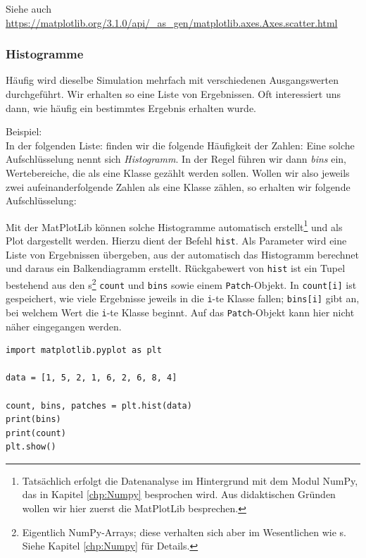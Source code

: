 Siehe auch \url{https://matplotlib.org/3.1.0/api/_as_gen/matplotlib.axes.Axes.scatter.html}

\subsubsection{Histogramme}
Häufig wird dieselbe Simulation mehrfach mit verschiedenen Ausgangswerten durchgeführt. Wir erhalten so eine Liste von Ergebnissen. Oft interessiert uns dann, wie häufig ein bestimmtes Ergebnis erhalten wurde. 

Beispiel:\\
In der folgenden Liste:
finden wir die folgende Häufigkeit der Zahlen:
Eine solche Aufschlüsselung nennt sich \emph{Histogramm}. In der Regel führen wir dann \emph{bins} ein, \ie Wertebereiche, die als eine Klasse gezählt werden sollen. Wollen wir also jeweils zwei aufeinanderfolgende Zahlen als eine Klasse zählen, so erhalten wir folgende Aufschlüsselung:

Mit der MatPlotLib können solche Histogramme automatisch erstellt\footnote{Tatsächlich erfolgt die Datenanalyse im Hintergrund mit dem Modul NumPy, das in Kapitel \ref{chp:Numpy} besprochen wird. Aus didaktischen Gründen wollen wir hier zuerst die MatPlotLib besprechen.} und als Plot dargestellt werden. Hierzu dient der Befehl \texttt{hist}. Als Parameter wird eine Liste von Ergebnissen übergeben, aus der automatisch das Histogramm berechnet und daraus ein Balkendiagramm erstellt. Rückgabewert von \texttt{hist} ist ein Tupel bestehend aus den s\footnote{Eigentlich NumPy-Arrays; diese verhalten sich aber im Wesentlichen wie s. Siehe Kapitel \ref{chp:Numpy} für Details.} \texttt{count} und \texttt{bins} sowie einem \texttt{Patch}-Objekt. In \texttt{count[i]} ist gespeichert, wie viele Ergebnisse jeweils in die \texttt{i}-te Klasse fallen; \texttt{bins[i]} gibt an, bei welchem Wert die \texttt{i}-te Klasse beginnt. Auf das \texttt{Patch}-Objekt kann hier nicht näher eingegangen werden.

\begin{codebox}
\begin{verbatim}
import matplotlib.pyplot as plt

data = [1, 5, 2, 1, 6, 2, 6, 8, 4]

count, bins, patches = plt.hist(data)
print(bins)
print(count)
plt.show()
\end{verbatim}
\end{codebox}

